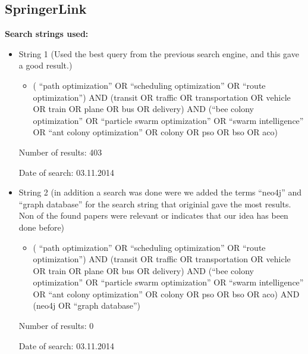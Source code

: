\subsection{SpringerLink}
\textbf{Search strings used:}
\begin{itemize}
\item String 1 (Used the best query from the previous search engine, and this gave a good result.)
\begin{itemize}
\item ( ``path optimization'' OR ``scheduling optimization'' OR ``route optimization'') AND (transit OR traffic OR transportation OR vehicle OR train OR plane OR bus OR delivery) AND (``bee colony optimization'' OR ``particle swarm optimization'' OR ``swarm intelligence'' OR ``ant colony optimization'' OR colony OR pso OR bso OR aco)
\end{itemize}
\par
Number of results: 403
\par
Date of search: 03.11.2014
\end{itemize}
\begin{itemize}
\item String 2 (in addition a search was done were we added the terms ``neo4j'' and ``graph database'' for the search string that originial gave the most results. Non of the found papers were relevant or indicates that our idea has been done before)
\begin{itemize}
\item ( ``path optimization'' OR ``scheduling optimization'' OR ``route optimization'') AND (transit OR traffic OR transportation OR vehicle OR train OR plane OR bus OR delivery) AND (``bee colony optimization'' OR ``particle swarm optimization'' OR ``swarm intelligence'' OR ``ant colony optimization'' OR colony OR pso OR bso OR aco) AND (neo4j OR ``graph database'')
\end{itemize}
\par
Number of results: 0
\par
Date of search: 03.11.2014
\end{itemize}


